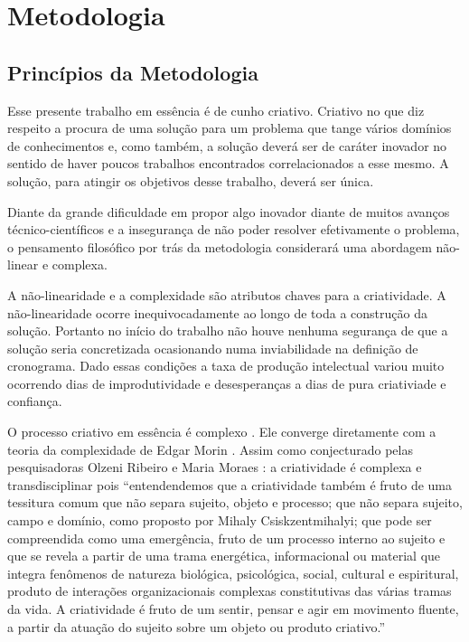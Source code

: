 \chapter{Metodologia}
\label{chap:metodologia}

\section{Princípios da Metodologia}
\label{sec:principios}

Esse presente trabalho em essência é de cunho criativo. Criativo no que diz respeito a procura de uma solução para um problema que tange vários domínios de conhecimentos e, como também, a solução deverá ser de caráter inovador no sentido de haver poucos trabalhos encontrados correlacionados a esse mesmo. A solução, para atingir os objetivos desse trabalho, deverá ser única.

Diante da grande dificuldade em propor algo inovador diante de muitos avanços técnico-científicos e a insegurança de não poder resolver efetivamente o problema, o pensamento filosófico por trás da metodologia considerará uma abordagem não-linear e complexa.

A não-linearidade e a complexidade são atributos chaves para a criatividade. A não-linearidade ocorre inequivocadamente ao longo de toda a construção da solução. Portanto no início do trabalho não houve nenhuma segurança de que a solução seria concretizada ocasionando numa inviabilidade na definição de cronograma. Dado essas condições a taxa de produção intelectual variou muito ocorrendo dias de improdutividade e desesperanças a dias de pura criativiade e confiança.

O processo criativo em essência é complexo \cite{criatividade}. Ele converge diretamente com a teoria da complexidade de Edgar Morin \cite{morin}. Assim como conjecturado pelas pesquisadoras Olzeni Ribeiro e Maria Moraes \cite{criatividade}: a criatividade é complexa e transdisciplinar pois ``entendendemos que a criatividade também é fruto de uma tessitura comum que não separa sujeito, objeto e processo; que não separa sujeito, campo e domínio, como proposto por Mihaly Csiskzentmihalyi; que pode ser compreendida como uma emergência, fruto de um processo interno ao sujeito e que se revela a partir de uma trama energética, informacional ou material que integra fenômenos de natureza biológica, psicológica, social, cultural e espiritural, produto de interações organizacionais complexas constitutivas das várias tramas da vida. A criatividade é fruto de um sentir, pensar e agir em movimento fluente, a partir da atuação do sujeito sobre um objeto ou produto criativo.''


